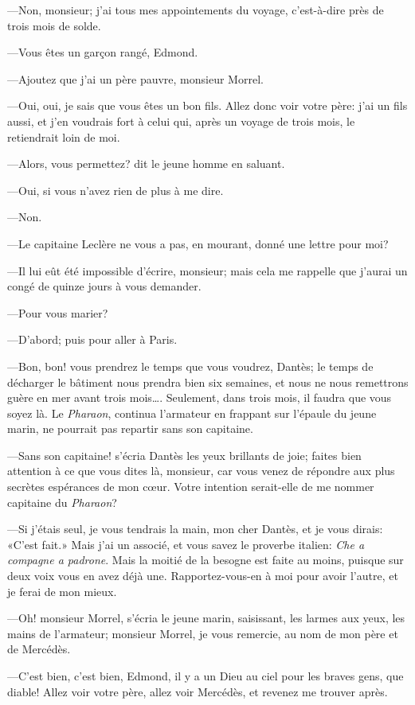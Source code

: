 —Non, monsieur; j'ai tous mes appointements du voyage, c'est-à-dire près de trois mois de solde.

—Vous êtes un garçon rangé, Edmond.

—Ajoutez que j'ai un père pauvre, monsieur Morrel.

—Oui, oui, je sais que vous êtes un bon fils. Allez donc voir votre père: j'ai un fils aussi, et j'en voudrais fort à celui qui, après un voyage de trois mois, le retiendrait loin de moi.

—Alors, vous permettez? dit le jeune homme en saluant.

—Oui, si vous n'avez rien de plus à me dire.

—Non.

—Le capitaine Leclère ne vous a pas, en mourant, donné une lettre pour moi?

—Il lui eût été impossible d'écrire, monsieur; mais cela me rappelle que j'aurai un congé de quinze jours à vous demander.

—Pour vous marier?

—D'abord; puis pour aller à Paris.

—Bon, bon! vous prendrez le temps que vous voudrez, Dantès; le temps de décharger le bâtiment nous prendra bien six semaines, et nous ne nous remettrons guère en mer avant trois mois\dots. Seulement, dans trois mois, il faudra que vous soyez là. Le \textit{Pharaon}, continua l'armateur en frappant sur l'épaule du jeune marin, ne pourrait pas repartir sans son capitaine.

—Sans son capitaine! s'écria Dantès les yeux brillants de joie; faites bien attention à ce que vous dites là, monsieur, car vous venez de répondre aux plus secrètes espérances de mon cœur. Votre intention serait-elle de me nommer capitaine du \textit{Pharaon}?

—Si j'étais seul, je vous tendrais la main, mon cher Dantès, et je vous dirais: «C'est fait.» Mais j'ai un associé, et vous savez le proverbe italien: \textit{Che a compagne a padrone}. Mais la moitié de la besogne est faite au moins, puisque sur deux voix vous en avez déjà une. Rapportez-vous-en à moi pour avoir l'autre, et je ferai de mon mieux.

—Oh! monsieur Morrel, s'écria le jeune marin, saisissant, les larmes aux yeux, les mains de l'armateur; monsieur Morrel, je vous remercie, au nom de mon père et de Mercédès.

—C'est bien, c'est bien, Edmond, il y a un Dieu au ciel pour les braves gens, que diable! Allez voir votre père, allez voir Mercédès, et revenez me trouver après.


